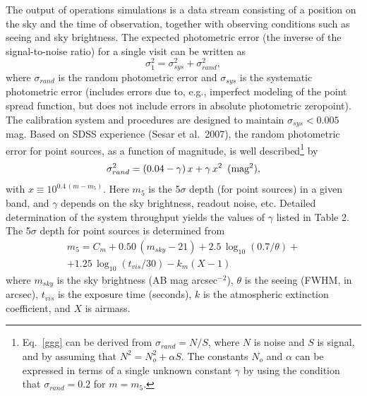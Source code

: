The output of operations simulations is a data stream consisting of
a position on the sky and the time of observation, together with
observing conditions such as seeing and sky brightness. The expected
photometric error (the inverse of the signal-to-noise ratio) for a single visit
can be written as
\begin{equation}
         \sigma_1^2 = \sigma_{sys}^2 + \sigma_{rand}^2,
\end{equation}
where $\sigma_{rand}$ is the random photometric error and $\sigma_{sys}$ is
the systematic photometric error (includes errors due to, e.g., imperfect
modeling of the point spread function, but does not include errors in
absolute photometric zeropoint). The calibration system and procedures
are designed to maintain $\sigma_{sys}<0.005$ mag. Based on
SDSS experience (Sesar et al.~2007), the random photometric error for
point sources, as
a function of magnitude, is well described\footnote{Eq.~\ref{ggg} can
be derived from $\sigma_{rand}=N/S$, where $N$ is noise and $S$ is signal,
and by assuming that $N^2 = N_o^2 + \alpha S$. The constants $N_o$ and
$\alpha$ can be expressed in terms of a single unknown constant $\gamma$
by using the condition that $\sigma_{rand}=0.2$ for $m=m_5$.} by
\begin{equation}
\label{ggg}
  \sigma_{rand}^2 = (0.04-\gamma)\, x + \gamma \, x^2 \,\,\, {\rm (mag^2),}
\end{equation}
with $x \equiv 10^{0.4\,(m-m_5)}$. Here $m_5$ is the 5$\sigma$ depth (for
point sources) in a given band, and $\gamma$ depends on the sky
brightness, readout noise, etc.
Detailed determination of the system throughput yields the values of $\gamma$
listed in Table 2. The 5$\sigma$ depth for point sources is determined from
\begin{eqnarray}
\label{m5}
  m_5 = C_m + 0.50\,(m_{sky}-21) + 2.5\,\log_{10}(0.7/\theta) +  \nonumber \\
        + 1.25\,\log_{10}(t_{vis}/30) - k_m(X-1) \phantom{xxxxx}
\end{eqnarray}
where $m_{sky}$ is the sky brightness (AB mag arcsec$^{-2}$), $\theta$ is
the seeing (FWHM, in arcsec), $t_{vis}$ is the exposure time (seconds),
$k$ is the atmospheric extinction coefficient, and $X$ is airmass.


